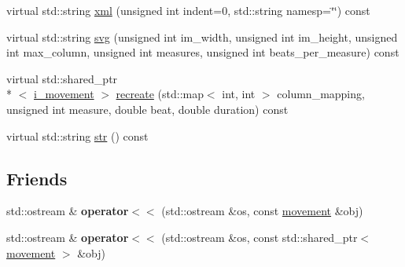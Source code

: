 \begin{DoxyCompactItemize}
\item 
virtual std\-::string \hyperlink{classmae_1_1fl_1_1laban_1_1movement_abadb2cff01fb0835f042ce5a3b69300f}{xml} (unsigned int indent=0, std\-::string namesp=\char`\"{}\char`\"{}) const 
\item 
virtual std\-::string \hyperlink{classmae_1_1fl_1_1laban_1_1movement_a6ec35edce232832f663093f853a73d4c}{svg} (unsigned int im\-\_\-width, unsigned int im\-\_\-height, unsigned int max\-\_\-column, unsigned int measures, unsigned int beats\-\_\-per\-\_\-measure) const 
\item 
virtual std\-::shared\-\_\-ptr\\*
$<$ \hyperlink{classmae_1_1fl_1_1laban_1_1i__movement}{i\-\_\-movement} $>$ \hyperlink{classmae_1_1fl_1_1laban_1_1movement_af0c439b0b0d3c16516bce1953011922f}{recreate} (std\-::map$<$ int, int $>$ column\-\_\-mapping, unsigned int measure, double beat, double duration) const 
\item 
virtual std\-::string \hyperlink{classmae_1_1fl_1_1laban_1_1movement_a726883dc9180ead73f9039523367f1fc}{str} () const 
\end{DoxyCompactItemize}
\subsection*{Friends}
\begin{DoxyCompactItemize}
\item 
\hypertarget{classmae_1_1fl_1_1laban_1_1movement_af30ba5fdb954014180ce50b96cfb6797}{std\-::ostream \& {\bfseries operator$<$$<$} (std\-::ostream \&os, const \hyperlink{classmae_1_1fl_1_1laban_1_1movement}{movement} \&obj)}\label{classmae_1_1fl_1_1laban_1_1movement_af30ba5fdb954014180ce50b96cfb6797}

\item 
\hypertarget{classmae_1_1fl_1_1laban_1_1movement_a2239c926a5d434e8bb1e9bdf6a204224}{std\-::ostream \& {\bfseries operator$<$$<$} (std\-::ostream \&os, const std\-::shared\-\_\-ptr$<$ \hyperlink{classmae_1_1fl_1_1laban_1_1movement}{movement} $>$ \&obj)}\label{classmae_1_1fl_1_1laban_1_1movement_a2239c926a5d434e8bb1e9bdf6a204224}

\end{DoxyCompactItemize}


